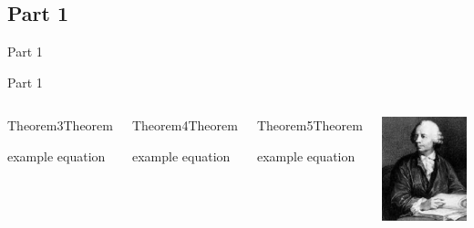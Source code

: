 \documentclass[xcolor=dvipsnames,table]{beamer}
\begin{document}
	\subsection{Part 1}{Part 1}
		\begin{frame}{Part 1}
		\begin{columns}
			\begin{block}{Theorem3}{Theorem}
			\begin{center}
				{example equation}
			\end{center}
			\end{block}		  		
		  	\begin{block}{Theorem4}{Theorem}
		  	\begin{center}
				{example equation} 
			\end{center}
			\end{block}
			\begin{block}{Theorem5}{Theorem}
			\begin{center}
				{example equation}
			\end{center}
			\end{block}
			\begin{center}
				\includegraphics[height=.5\textheight]{images/euler.png}
			\end{center}	
		\end{columns}
		\end{frame}

\end{document}

